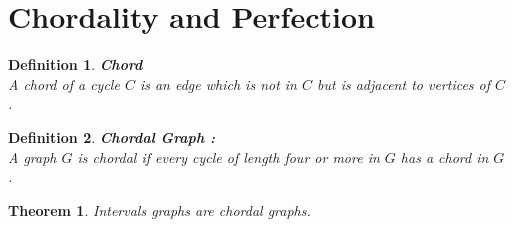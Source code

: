 \documentclass{article}
\newtheorem{definition}{Definition}[section]
\newtheorem{theorem}{Theorem}[section]
\begin{document}
\section{Chordality and Perfection}

\begin{definition}
    \textbf{Chord} \\
    A chord of a cycle $C$ is an edge which is not in $C$ but is adjacent to vertices of $C$ \cite{on_chordal}.
\end{definition}

\begin{definition}
    \textbf{Chordal Graph : } \\
    A graph $G$ is chordal if every cycle of length four or
    more in $G$ has a chord in $G$ \cite{on_chordal}.
\end{definition}

\begin{theorem}
    Intervals graphs are chordal graphs.
    \label{theorem:interval_is_chordal}
\end{theorem}
\end{document}
